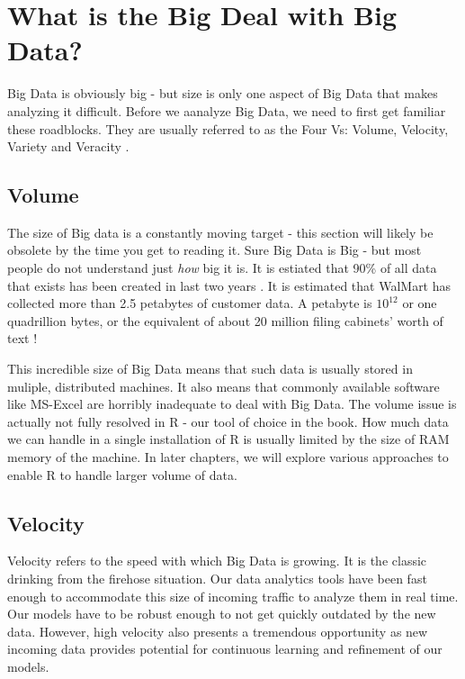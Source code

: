 \documentclass[10pt, letterpaper, twoside]{memoir}\usepackage{knitr}
\begin{document}
\section{What is the Big Deal with Big Data?}

Big Data is obviously big - but size is only one aspect of Big Data that makes analyzing it difficult. Before we aanalyze Big Data, we need to first get familiar these roadblocks. They are usually referred to as the Four Vs: Volume, Velocity, Variety and Veracity \citep{Infograp69:online}.

\subsection{Volume}

The size of Big data is a constantly moving target - this section will likely be obsolete by the time you get to reading it. Sure Big Data is Big - but most people do not understand just \emph{how} big it is. It is estiated that 90\% of all data that exists has been created in last two years \citep{IBMWhati26:online}. It is estimated that WalMart has collected more than 2.5  petabytes of customer data. A petabyte is $10 ^ {12}$ or one quadrillion bytes, or the equivalent of about 20 million filing cabinets' worth of text \citep{mcafee2012big}!

This incredible size of Big Data means that such data is usually stored in muliple, distributed machines. It also means that commonly available software like MS-Excel are horribly inadequate to deal with Big Data. The volume issue is actually not fully resolved in R - our tool of choice in the book. How much data we can handle in a single installation of R is usually limited by the size of RAM memory of the machine. In later chapters, we will explore various approaches to enable R to handle larger volume of data.

\subsection{Velocity}

Velocity refers to the speed with which Big Data is growing. It is the classic drinking from the firehose situation. Our data analytics tools have been fast enough to accommodate this size of incoming traffic to analyze them in real time. Our models have to be robust enough to not get quickly outdated by the new data. However, high velocity also presents a tremendous opportunity as new incoming data provides potential for continuous learning and refinement of our models.
\end{document}
